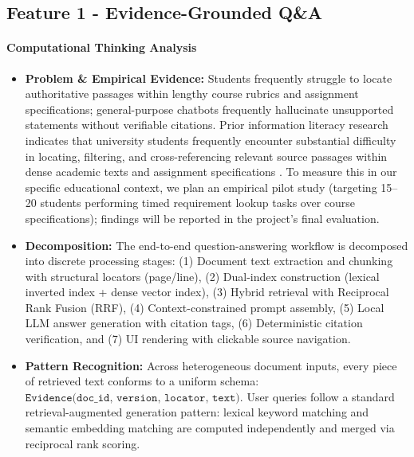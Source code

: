 
\subsection*{Feature 1 - Evidence-Grounded Q\&A}

\label{sec:feature-1}



\paragraph*{Computational Thinking Analysis}

\begin{itemize}[leftmargin=*,itemsep=3pt]

    \item \textbf{Problem \& Empirical Evidence:} Students frequently struggle to locate authoritative passages within lengthy course rubrics and assignment specifications; general-purpose chatbots frequently hallucinate unsupported statements without verifiable citations. Prior information literacy research indicates that university students frequently encounter substantial difficulty in locating, filtering, and cross-referencing relevant source passages within dense academic texts and assignment specifications \cite{head2011everyday}. To measure this in our specific educational context, we plan an empirical pilot study (targeting 15--20 students performing timed requirement lookup tasks over course specifications); findings will be reported in the project's final evaluation.

    \item \textbf{Decomposition:} The end-to-end question-answering workflow is decomposed into discrete processing stages: (1) Document text extraction and chunking with structural locators (page/line), (2) Dual-index construction (lexical inverted index + dense vector index), (3) Hybrid retrieval with Reciprocal Rank Fusion (RRF), (4) Context-constrained prompt assembly, (5) Local LLM answer generation with citation tags, (6) Deterministic citation verification, and (7) UI rendering with clickable source navigation.

    \item \textbf{Pattern Recognition:} Across heterogeneous document inputs, every piece of retrieved text conforms to a uniform schema: $\texttt{Evidence(doc\_id, version, locator, text)}$. User queries follow a standard retrieval-augmented generation pattern: lexical keyword matching and semantic embedding matching are computed independently and merged via reciprocal rank scoring.


\end{itemize}
